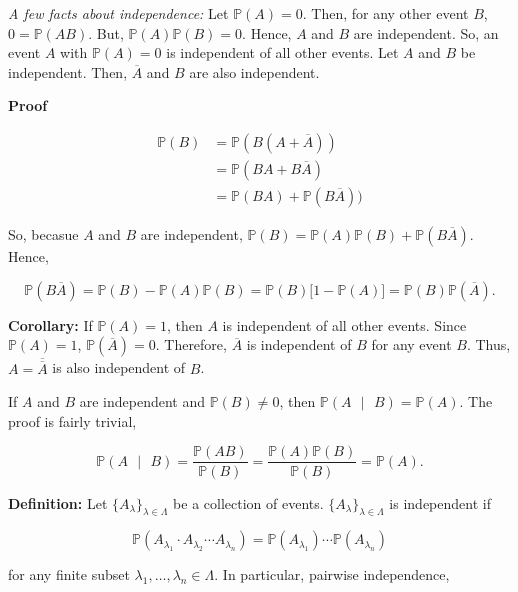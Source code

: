 \documentclass[12pt]{article}
\newcommand{\prob}[1]{\mathbb{P}(#1)}
\newcommand{\condprob}[2]{\mathbb{P}(#1 \text{ } \lvert \text{ } #2)}
\newcommand{\nspace}{\vspace*{.5cm}}
\begin{document}
\noindent
\textit{A few facts about independence:} Let $\prob{A}=0$. Then, for any other event $B$, $0=\prob{AB}$. But, $\prob{A}\prob{B} = 0$. Hence, $A$ and $B$ are independent. So, an event $A$ with $\prob{A} = 0$ is independent of all other events. Let $A$ and $B$ be independent. Then, $\overline{A}$ and $B$ are also independent.

\vspace*{.5cm}
\noindent
\textbf{Proof}

\begin{align*}
\prob{B} & = \prob{B (A+\overline{A})} \\
& = \prob{BA+B\overline{A}} \\
& = \prob{BA}+ \prob{B\overline{A})}
\end{align*}

\noindent
So, becasue $A$ and $B$ are independent, $\prob{B} = \prob{A} \prob{B} + \prob{B \overline{A}}$. Hence, 

\begin{equation*}
\prob{B \overline{A}} = \prob{B} - \prob{A} \prob{B} = \prob{B} \big [ 1 - \prob{A} \big ] = \prob{B}\prob{\overline{A}}.
\end{equation*}

\vspace*{.5cm}
\noindent
\textbf{Corollary:} If $\prob{A} = 1$, then $A$ is independent of all other events. Since $\prob{A} = 1$, $\prob{\overline{A}} = 0$. Therefore, $\overline{A}$ is independent of $B$ for any event $B$. Thus, $A = \overline{\overline{A}}$ is also independent of $B$.

\nspace
\noindent
If $A$ and $B$ are independent and $\prob{B} \neq 0$, then $\condprob{A}{B} = \prob{A}$. The proof is fairly trivial, 

\begin{equation*}
\condprob{A}{B} = \frac{\prob{AB}}{\prob{B}} = \frac{\prob{A}\prob{B}}{\prob{B}} = \prob{A}.
\end{equation*}

\nspace
\noindent
\textbf{Definition:} Let $\big \{ A_{\lambda} \big \}_{\lambda \in \Lambda}$ be a collection of events. $\big \{ A_{\lambda} \big \}_{\lambda \in \Lambda}$ is independent if 

\begin{equation*}
\prob{A_{\lambda_1} \cdot A_{\lambda_2} \cdots A_{\lambda_n}} = \prob{A_{\lambda_1}} \cdots \prob{A_{\lambda_n}} 
\end{equation*}

\noindent
for any finite subset $\lambda_1, \ldots, \lambda_n \in \Lambda$. In particular, pairwise independence,
\end{document}
